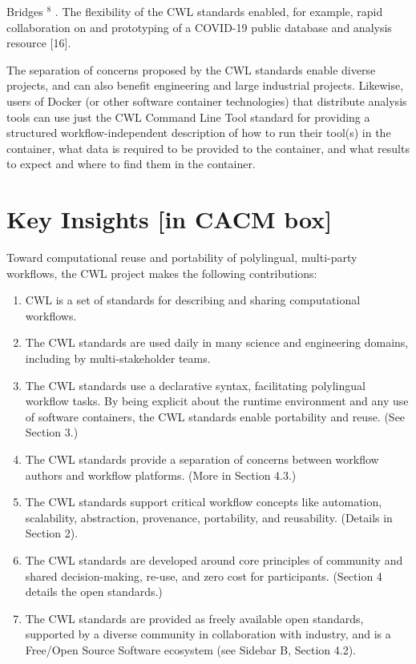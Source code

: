 \documentclass[
]{article}
\begin{document}
Bridges \(^{8}\) . The flexibility of the CWL standards enabled, for
example, rapid collaboration on and prototyping of a COVID-19 public
database and analysis resource {[}16{]}.

The separation of concerns proposed by the CWL standards enable diverse
projects, and can also benefit engineering and large industrial
projects. Likewise, users of Docker (or other software container
technologies) that distribute analysis tools can use just the CWL
Command Line Tool standard for providing a structured
workflow-independent description of how to run their tool(s) in the
container, what data is required to be provided to the container, and
what results to expect and where to find them in the container.

\section{Key Insights {[}in CACM box{]}}\label{key-insights-in-cacm-box}

Toward computational reuse and portability of polylingual, multi-party
workflows, the CWL project makes the following contributions:

\begin{enumerate}
\def\labelenumi{(\arabic{enumi})}
\item
  CWL is a set of standards for describing and sharing computational
  workflows.\\
\item
  The CWL standards are used daily in many science and engineering
  domains, including by multi-stakeholder teams.\\
\item
  The CWL standards use a declarative syntax, facilitating polylingual
  workflow tasks. By being explicit about the runtime environment and
  any use of software containers, the CWL standards enable portability
  and reuse. (See Section 3.)\\
\item
  The CWL standards provide a separation of concerns between workflow
  authors and workflow platforms. (More in Section 4.3.)
\item
  The CWL standards support critical workflow concepts like automation,
  scalability, abstraction, provenance, portability, and reusability.
  (Details in Section 2).\\
\item
  The CWL standards are developed around core principles of community
  and shared decision-making, re-use, and zero cost for participants.
  (Section 4 details the open standards.)\\
\item
  The CWL standards are provided as freely available open standards,
  supported by a diverse community in collaboration with industry, and
  is a Free/Open Source Software ecosystem (see Sidebar B, Section 4.2).
\end{enumerate}
\end{document}
